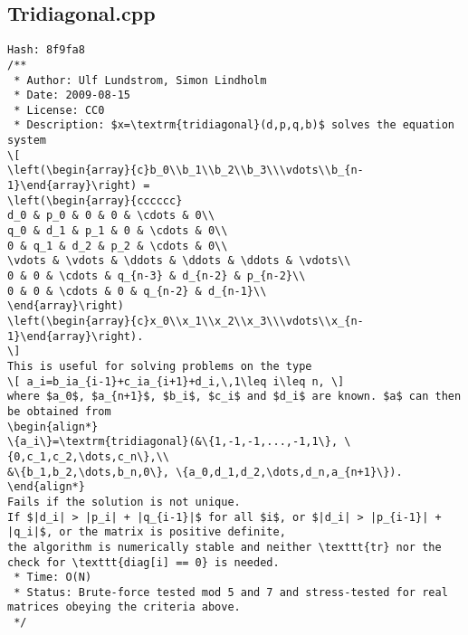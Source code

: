 \documentclass[11pt, a4paper, twoside]{article}
\begin{document}
\subsection{Tridiagonal.cpp}
\begin{lstlisting}
Hash: 8f9fa8
/**
 * Author: Ulf Lundstrom, Simon Lindholm
 * Date: 2009-08-15
 * License: CC0
 * Description: $x=\textrm{tridiagonal}(d,p,q,b)$ solves the equation system
\[
\left(\begin{array}{c}b_0\\b_1\\b_2\\b_3\\\vdots\\b_{n-1}\end{array}\right) =
\left(\begin{array}{cccccc}
d_0 & p_0 & 0 & 0 & \cdots & 0\\
q_0 & d_1 & p_1 & 0 & \cdots & 0\\
0 & q_1 & d_2 & p_2 & \cdots & 0\\
\vdots & \vdots & \ddots & \ddots & \ddots & \vdots\\
0 & 0 & \cdots & q_{n-3} & d_{n-2} & p_{n-2}\\
0 & 0 & \cdots & 0 & q_{n-2} & d_{n-1}\\
\end{array}\right)
\left(\begin{array}{c}x_0\\x_1\\x_2\\x_3\\\vdots\\x_{n-1}\end{array}\right).
\]
This is useful for solving problems on the type
\[ a_i=b_ia_{i-1}+c_ia_{i+1}+d_i,\,1\leq i\leq n, \]
where $a_0$, $a_{n+1}$, $b_i$, $c_i$ and $d_i$ are known. $a$ can then be obtained from
\begin{align*}
\{a_i\}=\textrm{tridiagonal}(&\{1,-1,-1,...,-1,1\}, \{0,c_1,c_2,\dots,c_n\},\\
&\{b_1,b_2,\dots,b_n,0\}, \{a_0,d_1,d_2,\dots,d_n,a_{n+1}\}).
\end{align*}
Fails if the solution is not unique.
If $|d_i| > |p_i| + |q_{i-1}|$ for all $i$, or $|d_i| > |p_{i-1}| + |q_i|$, or the matrix is positive definite,
the algorithm is numerically stable and neither \texttt{tr} nor the check for \texttt{diag[i] == 0} is needed.
 * Time: O(N)
 * Status: Brute-force tested mod 5 and 7 and stress-tested for real matrices obeying the criteria above.
 */


\end{lstlisting}
\end{document}
